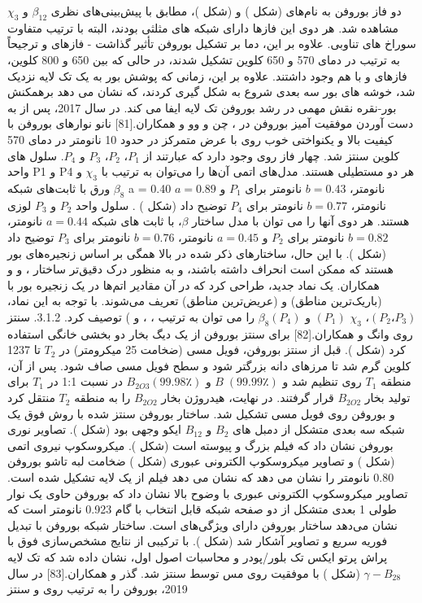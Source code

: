 دو فاز بوروفن به نام‌های  (شکل ) و  (شکل )، مطابق با پیش‌بینی‌های نظری $\beta_{12}$ و $\chi_{3}$ مشاهده شد. هر دوی این فازها دارای شبکه های مثلثی بودند، البته با ترتیب متفاوت سوراخ های تناوبی. علاوه بر این، دما بر تشکیل بوروفن تأثیر گذاشت - فازهای  و  ترجیحاً به ترتیب در دمای 570 و 650 کلوین تشکیل شدند، در حالی که بین 650 و 800 کلوین، فازهای  و  با هم وجود داشتند. علاوه بر این، زمانی که پوشش بور به یک تک لایه نزدیک شد، خوشه های بور سه بعدی شروع به شکل گیری کردند، که نشان می دهد برهمکنش بور-نقره نقش مهمی در رشد بوروفن تک لایه ایفا می کند. در سال 2017، پس از به دست آوردن موفقیت آمیز بوروفن در ، چن و وو و همکاران.[81] نانو نوارهای بوروفن با کیفیت بالا و یکنواختی خوب  روی  با عرض متمرکز در حدود 10 نانومتر در دمای 570 کلوین سنتز شد. چهار فاز روی  وجود دارد که عبارتند از $P_1$، $P_2$، $P_3$ و $P_4$. سلول های واحد P1 و P4 هر دو مستطیلی هستند. مدل‌های اتمی آن‌ها را می‌توان به ترتیب با $\chi_3$ و $\beta_8$ ورق با ثابت‌های شبکه a = 0.40 نانومتر، $b = 0.43$ نانومتر برای $P_1$ و $a = 0.89$ نانومتر، $b = 0.77$ نانومتر برای $P_4$ توضیح داد (شکل ) . سلول واحد $P_2$ و $P_3$ لوزی هستند. هر دوی آنها را می توان با مدل ساختار $\beta$، با ثابت های شبکه $a = 0.44$ نانومتر، $b = 0.82$ نانومتر برای $P_2$ و $a = 0.45$ نانومتر، $b = 0.76$ نانومتر برای $P_3$ توضیح داد (شکل ). با این حال، ساختارهای ذکر شده در بالا همگی بر اساس زنجیره‌های بور هستند که ممکن است انحراف داشته باشند، و به منظور درک دقیق‌تر ساختار ،  و  و همکاران. یک نماد جدید،  طراحی کرد که در آن مقادیر اتم‌ها در یک زنجیره بور با  (باریک‌ترین مناطق) و  (عریض‌ترین مناطق) تعریف می‌شوند. با توجه به این نماد، $(P_2، P_3)$، $\chi_3$ $(P_1)$ و $\beta_8(P_4)$ را می توان به ترتیب ، ، و ) توصیف کرد. 3.1.2. سنتز روی  وانگ و همکاران.[82] برای سنتز بوروفن از یک دیگ بخار دو بخشی  خانگی استفاده کرد (شکل ). قبل از سنتز بوروفن، فویل مسی (ضخامت 25 میکرومتر) در $T_2$ تا 1237 کلوین گرم شد تا مرزهای دانه بزرگتر شود و سطح فویل مسی صاف شود. پس از آن، منطقه $T_1$ روی  تنظیم شد و $B\; (99.99٪)$ و $B_{2O3} (99.98٪)$ در نسبت 1:1 در $T_1$ برای تولید بخار $B_{2O2}$ قرار گرفتند. در نهایت، هیدروژن بخار $B_{2O2}$ را به منطقه $T_2$ منتقل کرد و بوروفن روی فویل مسی تشکیل شد. ساختار بوروفن سنتز شده با روش فوق یک شبکه سه بعدی متشکل از دمبل های $B_2$ و $B_{12}$ ایکو وجهی بود (شکل ). تصاویر نوری بوروفن نشان داد که فیلم بزرگ و پیوسته است (شکل ). میکروسکوپ نیروی اتمی  (شکل ) و تصاویر میکروسکوپ الکترونی عبوری  (شکل ) ضخامت لبه تاشو بوروفن 0.80 نانومتر را نشان می دهد که نشان می دهد فیلم از یک لایه تشکیل شده است. تصاویر میکروسکوپ الکترونی عبوری با وضوح بالا  نشان داد که بوروفن حاوی یک نوار طولی 1 بعدی متشکل از دو صفحه شبکه قابل انتخاب با گام 0.923 نانومتر است که نشان می‌دهد ساختار بوروفن دارای ویژگی‌های  است. ساختار شبکه بوروفن با تبدیل فوریه سریع  و تصاویر  آشکار شد (شکل ). با ترکیبی از نتایج مشخص‌سازی فوق با پراش پرتو ایکس تک بلور/پودر و محاسبات اصول اول، نشان داده شد که تک لایه $\gamma-B_{28}$ (شکل ) با موفقیت روی مس توسط  سنتز شد. گذر و همکاران.[83] در سال 2019، بوروفن را به ترتیب روی  و  سنتز 